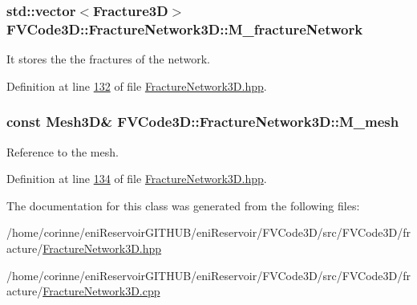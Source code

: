\subsubsection[{\texorpdfstring{M\+\_\+fracture\+Network}{M_fractureNetwork}}]{\setlength{\rightskip}{0pt plus 5cm}std\+::vector$<${\bf Fracture3D}$>$ F\+V\+Code3\+D\+::\+Fracture\+Network3\+D\+::\+M\+\_\+fracture\+Network\hspace{0.3cm}{\ttfamily [private]}}\hypertarget{classFVCode3D_1_1FractureNetwork3D_a1e0856e5834de015bd19c479724b89ba}{}\label{classFVCode3D_1_1FractureNetwork3D_a1e0856e5834de015bd19c479724b89ba}


It stores the the fractures of the network. 



Definition at line \hyperlink{FractureNetwork3D_8hpp_source_l00132}{132} of file \hyperlink{FractureNetwork3D_8hpp_source}{Fracture\+Network3\+D.\+hpp}.

\subsubsection[{\texorpdfstring{M\+\_\+mesh}{M_mesh}}]{\setlength{\rightskip}{0pt plus 5cm}const {\bf Mesh3D}\& F\+V\+Code3\+D\+::\+Fracture\+Network3\+D\+::\+M\+\_\+mesh\hspace{0.3cm}{\ttfamily [private]}}\hypertarget{classFVCode3D_1_1FractureNetwork3D_a3f6bc46ab46e3ee7ee608e73694cb87a}{}\label{classFVCode3D_1_1FractureNetwork3D_a3f6bc46ab46e3ee7ee608e73694cb87a}


Reference to the mesh. 



Definition at line \hyperlink{FractureNetwork3D_8hpp_source_l00134}{134} of file \hyperlink{FractureNetwork3D_8hpp_source}{Fracture\+Network3\+D.\+hpp}.



The documentation for this class was generated from the following files\+:\begin{DoxyCompactItemize}
\item 
/home/corinne/eni\+Reservoir\+G\+I\+T\+H\+U\+B/eni\+Reservoir/\+F\+V\+Code3\+D/src/\+F\+V\+Code3\+D/fracture/\hyperlink{FractureNetwork3D_8hpp}{Fracture\+Network3\+D.\+hpp}\item 
/home/corinne/eni\+Reservoir\+G\+I\+T\+H\+U\+B/eni\+Reservoir/\+F\+V\+Code3\+D/src/\+F\+V\+Code3\+D/fracture/\hyperlink{FractureNetwork3D_8cpp}{Fracture\+Network3\+D.\+cpp}\end{DoxyCompactItemize}
